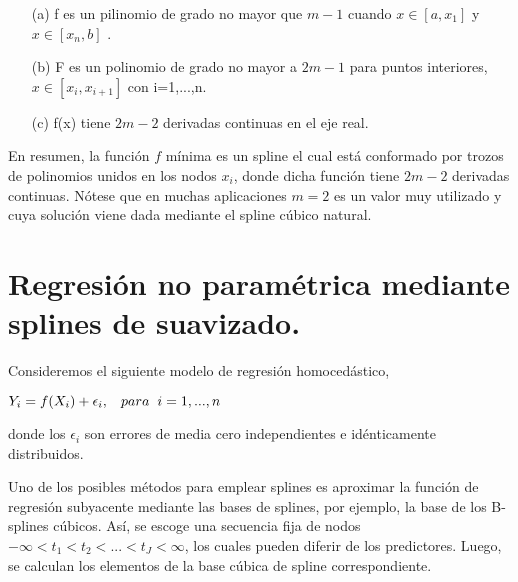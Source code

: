 \begin{itemize}
  \item[(a)] f es un pilinomio de grado no mayor que $m-1$ cuando $x \in [a,x_{1}]$ y $x \in [x_{n},b]$ .
  \item[(b)] F es un polinomio de grado no mayor a $2m-1$ para puntos interiores, $x \in [x_{i},x_{i+1}]$ con i=1,...,n.
  \item[(c)] f(x) tiene $2m-2$ derivadas continuas en el eje real.
\end{itemize}

\hspace{0.4cm} En resumen, la funci\'on $f$ m\'inima es un spline el cual est\'a conformado por trozos de polinomios unidos en los nodos $x_{i}$, donde dicha funci\'on tiene $2m-2$ derivadas continuas. N\'otese que en muchas aplicaciones $m=2$ es un valor muy utilizado y cuya soluci\'on viene dada mediante el spline c\'ubico natural.


\newpage

\section{Regresi\'on no param\'etrica mediante splines de suavizado.}

\hspace{0.4cm} Consideremos el siguiente modelo de regresi\'on homoced\'astico,\\

\begin{center}

$\displaystyle{Y_{i}=f(X_{i})+\epsilon_{i}}, \hspace{0.3cm} para \hspace{0.2cm} i=1,...,n$
\end{center}

\vspace{0.5cm}

\noindent donde los $\epsilon_{i}$ son errores de media cero independientes e id\'enticamente distribuidos.

\vspace{0.5cm}

\hspace{0.4cm} Uno de los posibles m\'etodos para emplear splines es aproximar la funci\'on de regresi\'on subyacente mediante las bases de splines, por ejemplo, la base de los B-splines c\'ubicos. As\'i, se escoge una secuencia fija de nodos $-\infty<t_{1}<t_{2}<...<t_{J}<\infty$, los cuales pueden diferir de los predictores. Luego, se calculan los elementos de la base c\'ubica de spline correspondiente.

